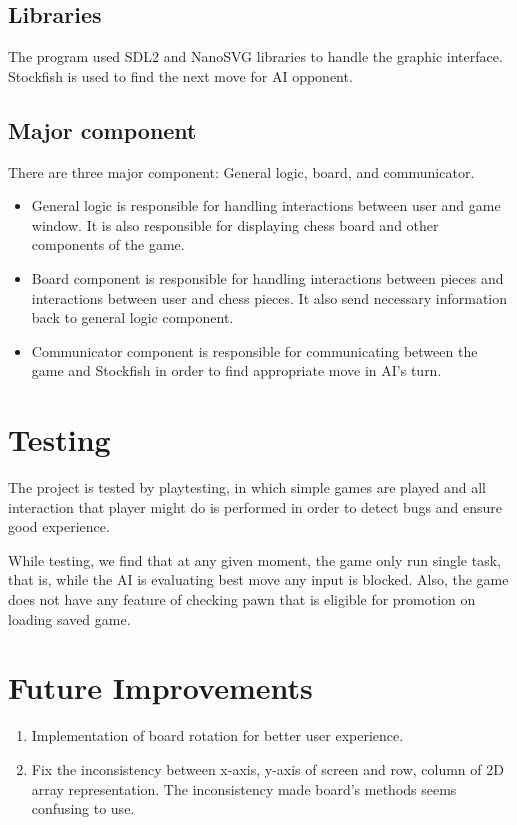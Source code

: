 \documentclass[a4paper, 10pt, titlepage]{report}
\begin{document}
\section{Libraries}
The program used SDL2 and NanoSVG libraries to handle the graphic interface. Stockfish is used to find the next move for AI opponent.
\section{Major component}
There are three major component: General logic, board, and communicator.
\begin{itemize}
  \item General logic is responsible for handling interactions between user and game window. It is also responsible for displaying chess board and other components of the game.
  \item Board component is responsible for handling interactions between pieces and interactions between user and chess pieces. It also send necessary information back to general logic component.
  \item Communicator component is responsible for communicating between the game and Stockfish in order to find appropriate move in AI's turn.
\end{itemize}
\chapter{Testing}

The project is tested by playtesting, in which simple games are played and all interaction that player might do is performed in order to detect bugs and ensure good experience.

While testing, we find that at any given moment, the game only run single task, that is, while the AI is evaluating best move any input is blocked. Also, the game does not have any feature of checking pawn that is eligible for promotion on loading saved game.

\chapter{Future Improvements}
\begin{enumerate}
  \item Implementation of board rotation for better user experience.
  \item Fix the inconsistency between x-axis, y-axis of screen and row, column of 2D array representation. The inconsistency made board's methods seems confusing to use.
\end{enumerate}
\end{document}
